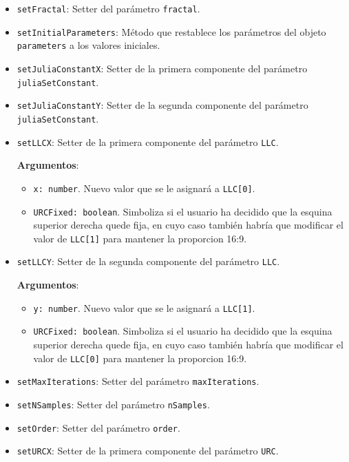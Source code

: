 \begin{itemize}
    \item \verb|setFractal|: Setter del parámetro \verb|fractal|.
    \item \verb|setInitialParameters|: Método que restablece los parámetros del objeto \verb|parameters| a los valores iniciales.
    \item \verb|setJuliaConstantX|: Setter de la primera componente del parámetro \verb|juliaSetConstant|.
    \item \verb|setJuliaConstantY|: Setter de la segunda componente del parámetro \verb|juliaSetConstant|.
    \item \verb|setLLCX|: Setter de la primera componente del parámetro \verb|LLC|.
    
    \textbf{Argumentos}:

    \begin{itemize}
        \item \verb|x: number|. Nuevo valor que se le asignará a \verb|LLC[0]|.
        \item \verb|URCFixed: boolean|. Simboliza si el usuario ha decidido que la esquina superior derecha quede fija, en cuyo caso también habría que modificar el valor de \verb|LLC[1]| para mantener la proporcion 16:9.
    \end{itemize}

    \item \verb|setLLCY|: Setter de la segunda componente del parámetro \verb|LLC|.
    
    \textbf{Argumentos}:
    
    \begin{itemize}
        \item \verb|y: number|. Nuevo valor que se le asignará a \verb|LLC[1]|.
        \item \verb|URCFixed: boolean|. Simboliza si el usuario ha decidido que la esquina superior derecha quede fija, en cuyo caso también habría que modificar el valor de \verb|LLC[0]| para mantener la proporcion 16:9.
    \end{itemize}
    \item \verb|setMaxIterations|: Setter del parámetro \verb|maxIterations|.
    \item \verb|setNSamples|: Setter del parámetro \verb|nSamples|.
    \item \verb|setOrder|: Setter del parámetro \verb|order|.
    \item \verb|setURCX|: Setter de la primera componente del parámetro \verb|URC|.
    

\end{itemize}
